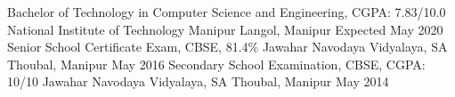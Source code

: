 
\begin{cventries}
  \cventry
    {Bachelor of Technology in Computer Science and Engineering, CGPA: 7.83/10.0} %
    {National Institute of Technology Manipur} %
    {Langol, Manipur} %
    {Expected May 2020} %
    {}
  \cventry
    {Senior School Certificate Exam, CBSE, 81.4\%} %
    {Jawahar Navodaya Vidyalaya, SA} %
    {Thoubal, Manipur} %
    {May 2016} %
    {}
  \cventry
    {Secondary School Examination, CBSE, CGPA: 10/10} %
    {Jawahar Navodaya Vidyalaya, SA} %
    {Thoubal, Manipur} %
    {May 2014} %
    {}
\end{cventries}